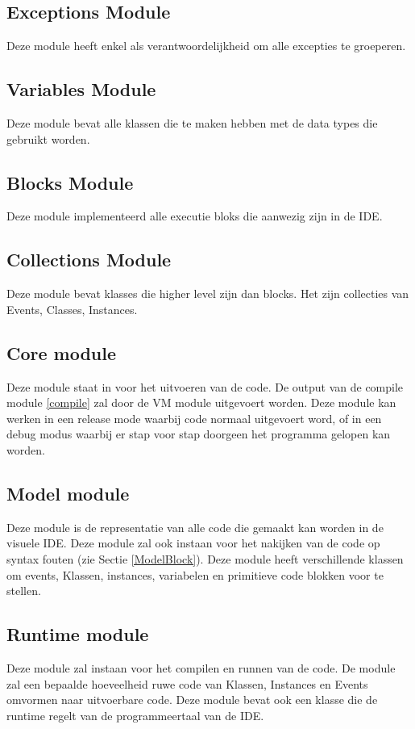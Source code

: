 \documentclass[]{article}
\begin{document}
\subsection{Exceptions Module}
\label{ExceptionsModule}
Deze module heeft enkel als verantwoordelijkheid om alle excepties te groeperen.

\subsection{Variables Module}
\label{VariablesModule}
Deze module bevat alle klassen die te maken hebben met de data types die gebruikt worden.

\subsection{Blocks Module}
\label{BlocksModule}
Deze module implementeerd alle executie bloks die aanwezig zijn in de IDE.

\subsection{Collections Module}
\label{CollectionsModule}
Deze module bevat klasses die higher level zijn dan blocks. Het zijn collecties van Events, Classes, Instances.

\subsection{Core module}
\label{CoreModule}
Deze module staat in voor het uitvoeren van de code. De output van de compile module \ref{compile} zal door de VM module uitgevoert worden. Deze module kan werken in een release mode waarbij code normaal uitgevoert word, of in een debug modus waarbij er stap voor stap doorgeen het programma gelopen kan worden. 

\subsection{Model module}
\label{ModelModule}
Deze module is de representatie van alle code die gemaakt kan worden in de visuele IDE. Deze module zal ook instaan voor het nakijken van de code op syntax fouten (zie Sectie \ref{ModelBlock}). Deze module heeft verschillende klassen om events, Klassen, instances, variabelen en primitieve code blokken voor te stellen. 

\subsection{Runtime module}
\label{RuntimeModule}
\label{compile}
Deze module zal instaan voor het compilen en runnen van de code. De module zal een bepaalde hoeveelheid ruwe code van Klassen, Instances en Events omvormen naar uitvoerbare code. Deze module bevat ook een klasse die de runtime regelt van de programmeertaal van de IDE.
\end{document}
